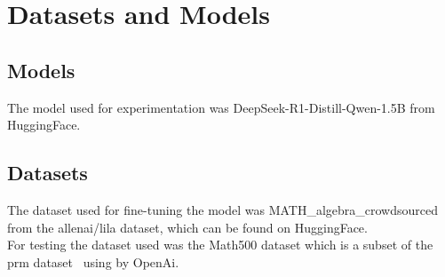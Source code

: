 \documentclass[10.5pt]{article}
\begin{document}
\section{Datasets and Models}
\subsection{Models}
The model used for experimentation was DeepSeek-R1-Distill-Qwen-1.5B from HuggingFace.
\subsection{Datasets}
The dataset used for fine-tuning the model was MATH\_algebra\_crowdsourced from the allenai/lila dataset\cite{Mishra2022Lila}, which can be found on HuggingFace. 
\\
For testing the dataset used was the Math500 dataset which is a subset of the prm dataset~\cite{lightman2023lets} using by OpenAi.
\end{document}
